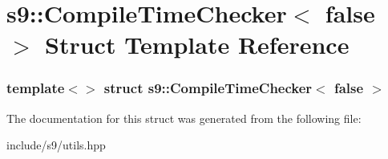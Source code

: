 \hypertarget{structs9_1_1CompileTimeChecker_3_01false_01_4}{\section{s9\-:\-:\-Compile\-Time\-Checker$<$ false $>$ \-Struct \-Template \-Reference}
\label{structs9_1_1CompileTimeChecker_3_01false_01_4}
}
\subsubsection*{template$<$$>$ struct s9\-::\-Compile\-Time\-Checker$<$ false $>$}



\-The documentation for this struct was generated from the following file\-:\begin{DoxyCompactItemize}
\item 
include/s9/utils.\-hpp\end{DoxyCompactItemize}
